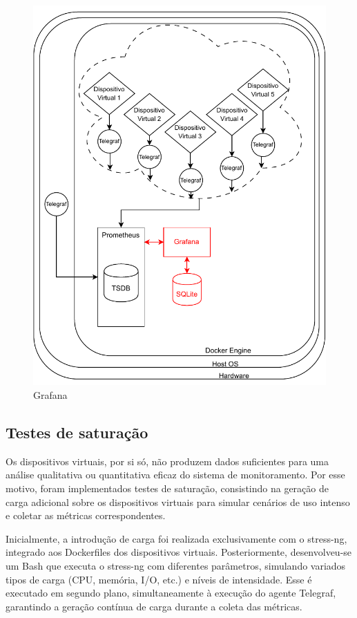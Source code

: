 \begin{figure}[H]
\centering
\includegraphics[scale=1]{Imagens/chap03/by-blocks/grafana_diagram.pdf}
\caption{Grafana}
\label{fig:DiagramaGrafana}
\end{figure}


\subsection{Testes de saturação}
\label{subsection:TestesSaturacao}

Os dispositivos virtuais, por si só, não produzem dados suficientes para uma análise qualitativa ou quantitativa eficaz do sistema de monitoramento. Por esse motivo, foram implementados testes de saturação, consistindo na geração de carga adicional sobre os dispositivos virtuais para simular cenários de uso intenso e coletar as métricas correspondentes.

Inicialmente, a introdução de carga foi realizada exclusivamente com o stress-ng, integrado aos Dockerfiles dos dispositivos virtuais. Posteriormente, desenvolveu-se um  Bash que executa o stress-ng com diferentes parâmetros, simulando variados tipos de carga (CPU, memória, I/O, etc.) e níveis de intensidade. Esse  é executado em segundo plano, simultaneamente à execução do agente Telegraf, garantindo a geração contínua de carga durante a coleta das métricas.

